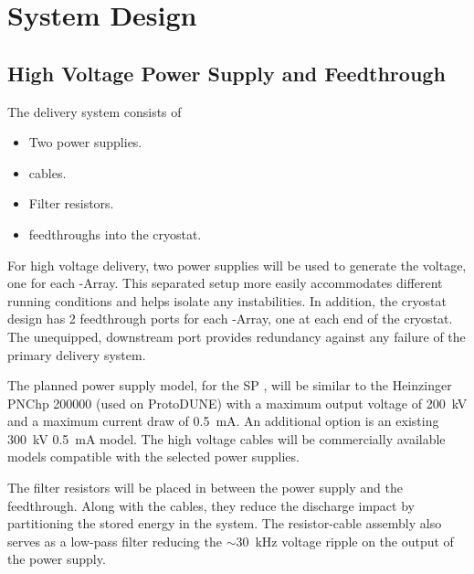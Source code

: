 \section{ System Design}
\label{sec:fdsp-hv-design}

\subsection {High Voltage Power Supply and Feedthrough}
The  delivery system consists of
\begin{itemize}
\item Two power supplies.
\item {} cables.
\item Filter resistors.
\item {} feedthroughs into the cryostat.
\end{itemize}

For high voltage delivery, two power supplies will be used to generate the voltage, one for each -Array. This separated setup more easily accommodates different running conditions and helps isolate any instabilities. In addition, the cryostat design has 2 feedthrough ports for each -Array, one at each end of the cryostat. The unequipped, downstream port provides redundancy against any failure of the primary  delivery system. 

The planned power supply model, for the SP , will be similar to the Heinzinger PNChp 200000 (used on ProtoDUNE) with a maximum output voltage of \SI{200}{kV} and a maximum current draw of \SI{0.5}{mA}.  An additional option is an existing \SI{300}{kV} \SI{0.5}{mA} model. The high voltage cables will be commercially available models compatible with the selected power supplies. 


The filter resistors will be placed in between the power supply and the feedthrough.  Along with the cables, they reduce the discharge impact by partitioning the stored energy in the system.  The resistor-cable assembly also serves as a low-pass filter reducing the $\sim$\SI{30}{kHz} voltage ripple on the output of the power supply.

